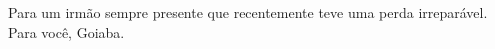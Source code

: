 %
%

\begin{dedicatoria}

Para um irmão sempre presente que recentemente teve uma perda irreparável. Para você, Goiaba.

\end{dedicatoria}
